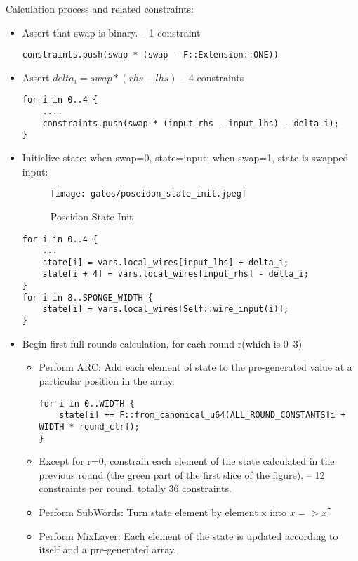 Calculation process and related constraints:
\begin{itemize}
    \item Assert that swap is binary. -- 1 constraint
    \begin{lstlisting}
constraints.push(swap * (swap - F::Extension::ONE))
    \end{lstlisting}
    \item Assert $delta_i = swap * (rhs - lhs)$ -- 4 constraints
    \begin{lstlisting}
for i in 0..4 {
    ....
    constraints.push(swap * (input_rhs - input_lhs) - delta_i);
}
    \end{lstlisting}
    \item Initialize state: when swap=0, state=input; when swap=1, state is swapped input:
    \begin{figure}[!h]
        \centering
        \texttt{[image: gates/poseidon\_state\_init.jpeg]}
        \caption{Poseidon State Init}
        \label{fig:poseidon-state-init}
    \end{figure}
    \begin{lstlisting}
for i in 0..4 {
    ...
    state[i] = vars.local_wires[input_lhs] + delta_i;
    state[i + 4] = vars.local_wires[input_rhs] - delta_i;
}
for i in 8..SPONGE_WIDTH {
    state[i] = vars.local_wires[Self::wire_input(i)];
}
    \end{lstlisting}
    \item Begin first full rounds calculation, for each round r(which is 0~3)
    \begin{itemize}
        \item Perform ARC: Add each element of state to the pre-generated value at a particular position in the array.
        \begin{lstlisting}
for i in 0..WIDTH {
    state[i] += F::from_canonical_u64(ALL_ROUND_CONSTANTS[i + WIDTH * round_ctr]);
}
        \end{lstlisting}
        \item Except for r=0, constrain each element of the state calculated in the previous round (the green part of the first slice of the figure). 
        -- 12 constraints per round, totally 36 constraints.
        \item Perform SubWords: Turn state element by element x into $x => x^7$
        \item Perform MixLayer: Each element of the state is updated according to itself and a pre-generated array.
        \begin{lstlisting}

\end{lstlisting}
\end{itemize}
\end{itemize}
